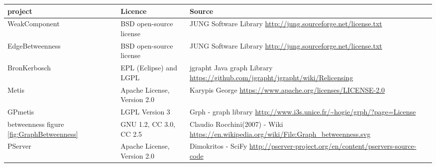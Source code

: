 \hspace{-9.0em}
    \begin{tabular}{ | p{4cm} | p{6cm} | p{8cm} | }
    \hline
    \textbf{project} & \textbf{Licence} & \textbf{Source} \\ \hline 
    WeakComponent & BSD open-source license & JUNG Software Library \url{http://jung.sourceforge.net/license.txt} \\ \hline  
    EdgeBetweenness & BSD open-source license & JUNG Software Library \url{http://jung.sourceforge.net/license.txt}  \\ \hline
    BronKerbosch & EPL (Eclipse) and LGPL  & jgrapht Java graph Library \url{https://github.com/jgrapht/jgrapht/wiki/Relicensing} \\ \hline
    Metis & Apache License, Version 2.0 & Karypis George \url{https://www.apache.org/licenses/LICENSE-2.0} \\ \hline  
    GPmetis & LGPL Version 3 & Grph - graph library \url{http://www.i3s.unice.fr/~hogie/grph/?page=License} \\ \hline
    betweenness figure \ref{fig:GraphBetweenness} & GNU 1.2, CC 3.0, CC 2.5 & Claudio Rocchini(2007) - Wiki \url{https://en.wikipedia.org/wiki/File:Graph_betweenness.svg} \\ \hline
    PServer & Apache License, Version 2.0 & Dimokritos - SciFy \url{http://pserver-project.org/en/content/pservers-source-code} \\ \hline
    \end{tabular}
